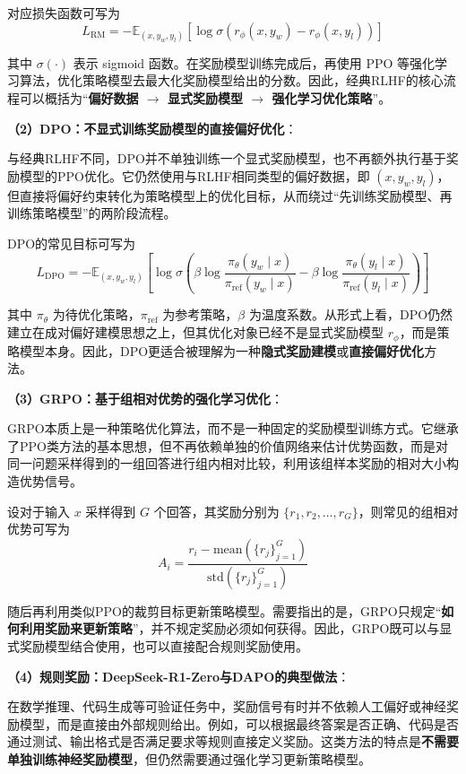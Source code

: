 \documentclass[UTF8]{ctexart}
\begin{document}
对应损失函数可写为
\[
L_{\mathrm{RM}}
=
-\mathbb{E}_{(x,y_w,y_l)}
\left[
\log \sigma\!\left(r_{\phi}(x,y_w)-r_{\phi}(x,y_l)\right)
\right]
\]

其中 $\sigma(\cdot)$ 表示 sigmoid 函数。在奖励模型训练完成后，再使用 PPO 等强化学习算法，优化策略模型去最大化奖励模型给出的分数。因此，经典RLHF的核心流程可以概括为“\textbf{偏好数据 $\rightarrow$ 显式奖励模型 $\rightarrow$ 强化学习优化策略}”。

\textbf{（2）DPO：不显式训练奖励模型的直接偏好优化}：

与经典RLHF不同，DPO并不单独训练一个显式奖励模型，也不再额外执行基于奖励模型的PPO优化。它仍然使用与RLHF相同类型的偏好数据，即 $(x,y_w,y_l)$，但直接将偏好约束转化为策略模型上的优化目标，从而绕过“先训练奖励模型、再训练策略模型”的两阶段流程。

DPO的常见目标可写为
\[
L_{\mathrm{DPO}}
=
-\mathbb{E}_{(x,y_w,y_l)}
\left[
\log \sigma
\left(
\beta
\log
\frac{\pi_{\theta}(y_w\mid x)}{\pi_{\mathrm{ref}}(y_w\mid x)}
-
\beta
\log
\frac{\pi_{\theta}(y_l\mid x)}{\pi_{\mathrm{ref}}(y_l\mid x)}
\right)
\right]
\]

其中 $\pi_{\theta}$ 为待优化策略，$\pi_{\mathrm{ref}}$ 为参考策略，$\beta$ 为温度系数。从形式上看，DPO仍然建立在成对偏好建模思想之上，但其优化对象已经不是显式奖励模型 $r_{\phi}$，而是策略模型本身。因此，DPO更适合被理解为一种\textbf{隐式奖励建模}或\textbf{直接偏好优化}方法。

\textbf{（3）GRPO：基于组相对优势的强化学习优化}：

GRPO本质上是一种策略优化算法，而不是一种固定的奖励模型训练方式。它继承了PPO类方法的基本思想，但不再依赖单独的价值网络来估计优势函数，而是对同一问题采样得到的一组回答进行组内相对比较，利用该组样本奖励的相对大小构造优势信号。

设对于输入 $x$ 采样得到 $G$ 个回答，其奖励分别为 $\{r_1,r_2,\ldots,r_G\}$，则常见的组相对优势可写为
\[
A_i
=
\frac{r_i-\mathrm{mean}(\{r_j\}_{j=1}^{G})}
{\mathrm{std}(\{r_j\}_{j=1}^{G})}
\]

随后再利用类似PPO的裁剪目标更新策略模型。需要指出的是，GRPO只规定“\textbf{如何利用奖励来更新策略}”，并不规定奖励必须如何获得。因此，GRPO既可以与显式奖励模型结合使用，也可以直接配合规则奖励使用。

\textbf{（4）规则奖励：DeepSeek-R1-Zero与DAPO的典型做法}：

在数学推理、代码生成等可验证任务中，奖励信号有时并不依赖人工偏好或神经奖励模型，而是直接由外部规则给出。例如，可以根据最终答案是否正确、代码是否通过测试、输出格式是否满足要求等规则直接定义奖励。这类方法的特点是\textbf{不需要单独训练神经奖励模型}，但仍然需要通过强化学习更新策略模型。
\end{document}
